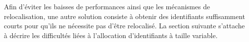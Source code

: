 Afin d'éviter les baisses de performances ainsi que les mécanismes de
relocalisation, une autre solution consiste à obtenir des identifiants
suffisamment courts pour qu'ils ne nécessite pas d'être relocalisé. La section
suivante s'attache à décrire les difficultés liées à l'allocation d'identifiants
à taille variable.






